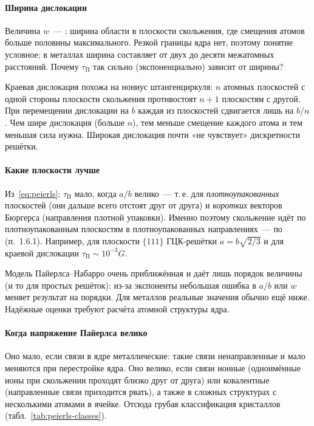 \paragraph{Ширина дислокации}
Величина $w$~— : ширина области в плоскости
скольжения, где смещения атомов больше половины максимального. Резкой
границы ядра нет, поэтому понятие условное; в металлах ширина составляет
от двух до десяти межатомных расстояний. Почему $\tau_\text{П}$ так
сильно (экспоненциально) зависит от ширины?

\begin{smysl}
Краевая дислокация похожа на нониус штангенциркуля: $n$ атомных
плоскостей с одной стороны плоскости скольжения противостоят $n+1$
плоскостям с другой. При перемещении дислокации на $b$ каждая из
плоскостей сдвигается лишь на $b/n$. Чем шире дислокация (больше $n$),
тем меньше смещение каждого атома и тем меньшая сила нужна. Широкая
дислокация почти «не чувствует» дискретности решётки.
\end{smysl}

\paragraph{Какие плоскости лучше}
Из~\eqref{eq:peierls}: $\tau_\text{П}$ мало, когда $a/b$ велико~— т.\,е.
для \emph{плотноупакованных} плоскостей (они дальше всего отстоят друг от
друга) и \emph{коротких} векторов Бюргерса (направления плотной упаковки).
Именно поэтому скольжение идёт по плотноупакованным плоскостям в
плотноупакованных направлениях~— по  (п.~1.6.1).
Например, для плоскости $\{111\}$ ГЦК-решётки $a=b\sqrt{2/3}$ и для
краевой дислокации $\tau_\text{П}\sim10^{-3}G$.

\begin{vnimanie}
Модель Пайерлса--Набарро очень приближённая и даёт лишь порядок величины
(и то для простых решёток): из-за экспоненты небольшая ошибка в $a/b$ или
$w$ меняет результат на порядки. Для металлов реальные значения обычно
ещё ниже. Надёжные оценки требуют расчёта атомной структуры ядра.
\end{vnimanie}

\paragraph{Когда напряжение Пайерлса велико}
Оно мало, если связи в ядре металлические: такие связи ненаправленные и
мало меняются при перестройке ядра. Оно велико, если связи ионные
(одноимённые ионы при скольжении проходят близко друг от друга) или
ковалентные (направленные связи приходится рвать), а также в сложных
структурах с несколькими атомами в ячейке. Отсюда грубая классификация
кристаллов (табл.~\ref{tab:peierls-classes}).

